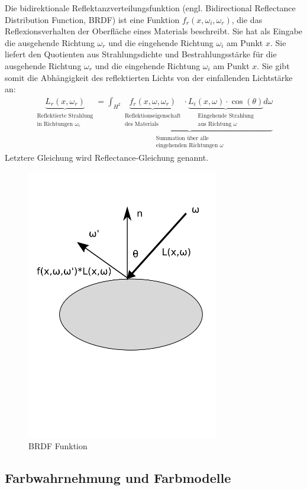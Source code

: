\begin{Definition}
Die  bidirektionale Reflektanzverteilungsfunktion (engl. Bidirectional Reflectance Distribution Function, BRDF)
ist eine Funktion $f_r (x, \omega_i, \omega_r)$, die das Reflexionsverhalten der Oberfläche eines Materials beschreibt. 
Sie hat als Eingabe die ausgehende Richtung $\omega_r$ und die eingehende Richtung  $\omega_i$ am Punkt $x$. 
Sie  liefert den Quotienten aus Strahlungsdichte und Bestrahlungsstärke für die ausgehende Richtung $\omega_r$ und die eingehende Richtung  $\omega_i$ am Punkt $x$.
Sie gibt somit die Abhängigkeit des reflektierten Lichts von der einfallenden Lichtstärke an: 
\begin{align}
\underbrace{L_r(x, \omega_r)}_{\substack{\text{Reflektierte Strahlung} \\ \text{in Richtungen $\omega_r$}}} =\underbrace{\int_{H^2} \underbrace{f_r (x, \omega, \omega_r)}_{\substack{\text{Reflektionseigenschaft} \\ \text{des Materials}}} \cdot  \underbrace{L_i(x, \omega) \cdot  \cos(\theta) }_{\substack{\text{Eingehende Strahlung} \\ \text{aus Richtung $\omega$}}} d\omega}_{\substack{\text{Summation über  alle } \\ \text{eingehenden Richtungen $\omega$}}} 
\end{align}
Letztere Gleichung wird  Reflectance-Gleichung genannt.
\end{Definition}
 \begin{figure}[H]
    \centering
    \includegraphics[width=0.75\textwidth]{images/brdf.png}
    \caption{BRDF Funktion}
    \label{fig:raytracin_brdf}
\end{figure}




\subsection{Farbwahrnehmung und Farbmodelle}
